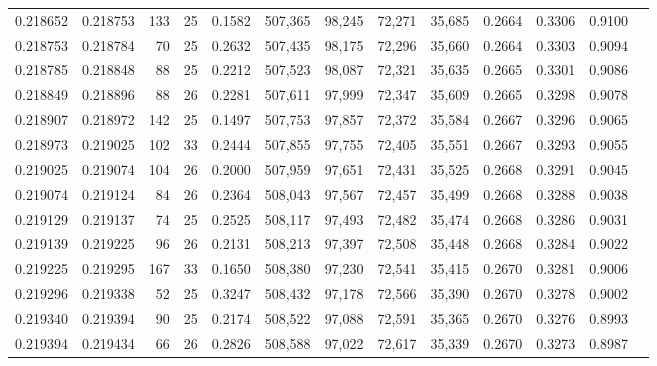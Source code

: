 \begin{tabular}{rrrrrrrrrrrrr}
0.218652 & 0.218753 & 133 &  25 &                                     0.1582 & 507,365 &  98,245 &  72,271 &  35,685 & 0.2664 & 0.3306 & 0.9100 \\
0.218753 & 0.218784 &  70 &  25 &                                     0.2632 & 507,435 &  98,175 &  72,296 &  35,660 & 0.2664 & 0.3303 & 0.9094 \\
0.218785 & 0.218848 &  88 &  25 &                                     0.2212 & 507,523 &  98,087 &  72,321 &  35,635 & 0.2665 & 0.3301 & 0.9086 \\
0.218849 & 0.218896 &  88 &  26 &                                     0.2281 & 507,611 &  97,999 &  72,347 &  35,609 & 0.2665 & 0.3298 & 0.9078 \\
0.218907 & 0.218972 & 142 &  25 &                                     0.1497 & 507,753 &  97,857 &  72,372 &  35,584 & 0.2667 & 0.3296 & 0.9065 \\
0.218973 & 0.219025 & 102 &  33 &                                     0.2444 & 507,855 &  97,755 &  72,405 &  35,551 & 0.2667 & 0.3293 & 0.9055 \\
0.219025 & 0.219074 & 104 &  26 &                                     0.2000 & 507,959 &  97,651 &  72,431 &  35,525 & 0.2668 & 0.3291 & 0.9045 \\
0.219074 & 0.219124 &  84 &  26 &                                     0.2364 & 508,043 &  97,567 &  72,457 &  35,499 & 0.2668 & 0.3288 & 0.9038 \\
0.219129 & 0.219137 &  74 &  25 &                                     0.2525 & 508,117 &  97,493 &  72,482 &  35,474 & 0.2668 & 0.3286 & 0.9031 \\
0.219139 & 0.219225 &  96 &  26 &                                     0.2131 & 508,213 &  97,397 &  72,508 &  35,448 & 0.2668 & 0.3284 & 0.9022 \\
0.219225 & 0.219295 & 167 &  33 &                                     0.1650 & 508,380 &  97,230 &  72,541 &  35,415 & 0.2670 & 0.3281 & 0.9006 \\
0.219296 & 0.219338 &  52 &  25 &                                     0.3247 & 508,432 &  97,178 &  72,566 &  35,390 & 0.2670 & 0.3278 & 0.9002 \\
0.219340 & 0.219394 &  90 &  25 &                                     0.2174 & 508,522 &  97,088 &  72,591 &  35,365 & 0.2670 & 0.3276 & 0.8993 \\
0.219394 & 0.219434 &  66 &  26 &                                     0.2826 & 508,588 &  97,022 &  72,617 &  35,339 & 0.2670 & 0.3273 & 0.8987 \\

\end{tabular}
